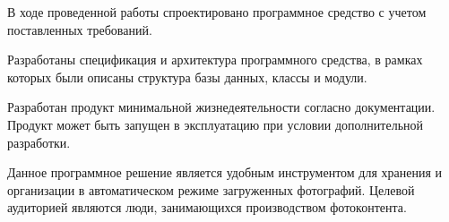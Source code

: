 
В ходе проведенной работы спроектировано программное средство с учетом поставленных требований. 

Разработаны спецификация и архитектура программного средства, в рамках которых были описаны структура базы данных, классы и модули.

Разработан продукт минимальной жизнедеятельности согласно документации.
Продукт может быть запущен в эксплуатацию при условии дополнительной разработки.

Данное программное решение является удобным инструментом для хранения и организации в автоматическом режиме загруженных фотографий. 
Целевой аудиторией являются люди, занимающихся производством фотоконтента.

\clearpage